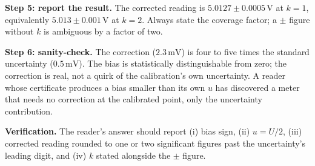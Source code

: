 \begin{exercise}
\textbf{Step 5: report the result.} The corrected reading is
$5.0127 \pm 0.0005 \,\si{\volt}$ at $k = 1$, equivalently
$5.013 \pm 0.001 \,\si{\volt}$ at $k = 2$. Always state the
coverage factor; a $\pm$ figure without $k$ is ambiguous by a factor
of two.

\textbf{Step 6: sanity-check.} The correction ($2.3 \,\si{\milli
\volt}$) is four to five times the standard uncertainty
($0.5 \,\si{\milli\volt}$). The bias is statistically distinguishable
from zero; the correction is real, not a quirk of the calibration's
own uncertainty. A reader whose certificate produces a bias smaller
than its own $u$ has discovered a meter that needs no correction at
the calibrated point, only the uncertainty contribution.

\textbf{Verification.} The reader's answer should report (i) bias
sign, (ii) $u = U/2$, (iii) corrected reading rounded to one or two
significant figures past the uncertainty's leading digit, and (iv)
$k$ stated alongside the $\pm$ figure.
\end{exercise}

